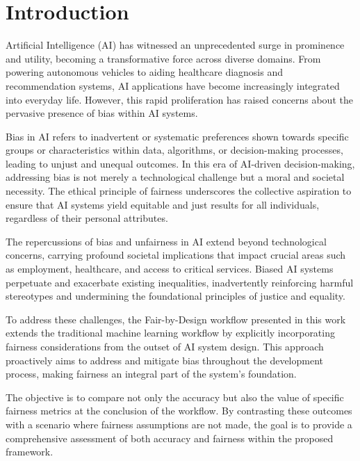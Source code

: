 \chapter{Introduction}
\label{chap:introduction}

Artificial Intelligence (AI) has witnessed an unprecedented surge in prominence and utility, becoming a transformative force across diverse domains. From powering autonomous vehicles to aiding healthcare diagnosis and recommendation systems, AI applications have become increasingly integrated into everyday life. However, this rapid proliferation has raised concerns about the pervasive presence of bias within AI systems.

Bias in AI refers to inadvertent or systematic preferences shown towards specific groups or characteristics within data, algorithms, or decision-making processes, leading to unjust and unequal outcomes. In this era of AI-driven decision-making, addressing bias is not merely a technological challenge but a moral and societal necessity. The ethical principle of fairness underscores the collective aspiration to ensure that AI systems yield equitable and just results for all individuals, regardless of their personal attributes.

The repercussions of bias and unfairness in AI extend beyond technological concerns, carrying profound societal implications that impact crucial areas such as employment, healthcare, and access to critical services. Biased AI systems perpetuate and exacerbate existing inequalities, inadvertently reinforcing harmful stereotypes and undermining the foundational principles of justice and equality.

To address these challenges, the Fair-by-Design workflow presented in this work extends the traditional machine learning workflow by explicitly incorporating fairness considerations from the outset of AI system design. This approach proactively aims to address and mitigate bias throughout the development process, making fairness an integral part of the system's foundation.

The objective is to compare not only the accuracy but also the value of specific fairness metrics at the conclusion of the workflow. By contrasting these outcomes with a scenario where fairness assumptions are not made, the goal is to provide a comprehensive assessment of both accuracy and fairness within the proposed framework.

